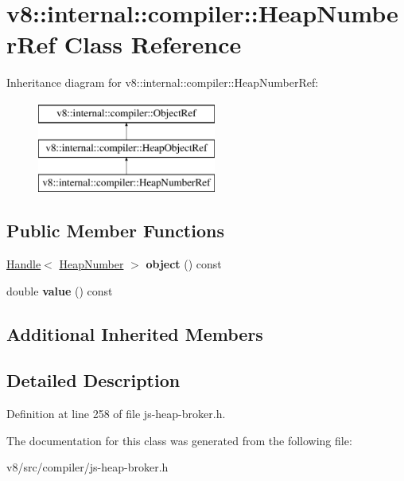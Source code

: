 \hypertarget{classv8_1_1internal_1_1compiler_1_1HeapNumberRef}{}\section{v8\+:\+:internal\+:\+:compiler\+:\+:Heap\+Number\+Ref Class Reference}
\label{classv8_1_1internal_1_1compiler_1_1HeapNumberRef}
Inheritance diagram for v8\+:\+:internal\+:\+:compiler\+:\+:Heap\+Number\+Ref\+:\begin{figure}[H]
\begin{center}
\leavevmode
\includegraphics[height=3.000000cm]{classv8_1_1internal_1_1compiler_1_1HeapNumberRef}
\end{center}
\end{figure}
\subsection*{Public Member Functions}
\begin{DoxyCompactItemize}
\item 
\mbox{\label{classv8_1_1internal_1_1compiler_1_1HeapNumberRef_af60d362fdab47b94674eb1d17644f8d3}} 
\mbox{\hyperlink{classv8_1_1internal_1_1Handle}{Handle}}$<$ \mbox{\hyperlink{classv8_1_1internal_1_1HeapNumber}{Heap\+Number}} $>$ {\bfseries object} () const
\item 
\mbox{\label{classv8_1_1internal_1_1compiler_1_1HeapNumberRef_a6ebd451d8a205b4d82c1f15091439da4}} 
double {\bfseries value} () const
\end{DoxyCompactItemize}
\subsection*{Additional Inherited Members}


\subsection{Detailed Description}


Definition at line 258 of file js-\/heap-\/broker.\+h.



The documentation for this class was generated from the following file\+:\begin{DoxyCompactItemize}
\item 
v8/src/compiler/js-\/heap-\/broker.\+h\end{DoxyCompactItemize}
